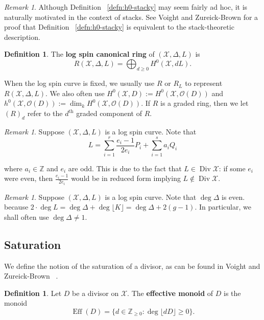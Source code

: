 \documentclass{amsart}
\theoremstyle{plain}
\theoremstyle{definition}
\newtheorem{defn}[thm]{Definition}
\theoremstyle{remark}
\newtheorem{rem}[thm]{Remark}
\numberwithin{equation}{section}
\newcommand\ssec{\subsection}
\newcommand\BZ{{\mathbb Z}}
\newcommand\sco{{\mathscr O}}
\DeclareMathOperator\di{Div}
\newcommand\sx{\mathscr X}
\newcommand \subhalf[1]{\frac{{#1} - 1}{2{#1}}}
\newcommand{\halfcan}{L}
\DeclareMathOperator{\Eff}{Eff}
\begin{document}
\begin{rem}
Although Definition ~\ref{defn:h0-stacky} may seem fairly ad hoc, it is naturally motivated in the context of stacks. See Voight and Zureick-Brown \cite[Lemma 5.4.7]{vzb:stacky} for a proof that Definition ~\ref{defn:h0-stacky} is equivalent to the stack-theoretic description.
\end{rem}

\begin{defn}
\label{defn:log-spin-canonical-ring}
The {\bf log spin canonical ring} of $(\sx, \Delta, \halfcan)$ is
\[
	R(\sx, \Delta, \halfcan) = \bigoplus_{d \geq 0} H^0(\sx, d \halfcan).
\]
\end{defn}

\noindent
When the log spin curve is fixed, we usually use $R$ or $R_\halfcan$ to
represent $R(\sx, \Delta, \halfcan)$. We also often use $H^0(\sx, D)
:= H^0(\sx, \sco(D))$ and $h^0(\sx, \sco(D)) := \dim_k H^0(\sx, \sco(D))$.
If $R$ is a graded ring, then we let $(R)_d$ refer to the $d^\text{th}$
graded component of $R$.

\begin{rem}
\label{rem:odd-denom}
Suppose $(\sx, \Delta, L)$ is a log spin curve. Note that
\[
	\halfcan = \sum_{i = 1}^{r} \subhalf{e_i} P_i + \sum_{i = 1}^{s} a_i Q_i
\]

\noindent
where $a_i \in \BZ$ and $e_i$ are odd. This is due to the fact
that $\halfcan \in \di \sx$: 
if some $e_i$ were even,
then $\frac{e_i - 1}{2e_i}$ would be in reduced form implying $\halfcan \notin \di \sx$.
\end{rem}
	
\begin{rem}
\label{rem:delta-not-1}
Suppose $(\sx, \Delta, \halfcan)$ is a log spin curve. Note that $\deg \Delta$
is even. because $2 \cdot \deg \halfcan = \deg \Delta + \deg \lfloor K
\rfloor = \deg \Delta + 2(g-1).$
In particular, we shall often use $\deg \Delta \neq 1$.
\end{rem}

\ssec{Saturation}

We define the notion of the saturation of a divisor, as can be found in
Voight and Zureick-Brown ~\cite[Section 7.2]{vzb:stacky}.

\begin{defn}
Let $D$ be a divisor on $\sx$. The \textbf{effective monoid} of $D$
is the monoid
\[
	\Eff(D) = \{d \in \BZ_{\geq 0} : \deg \lfloor dD \rfloor \geq 0 \}.
\]
\end{defn}
\end{document}
